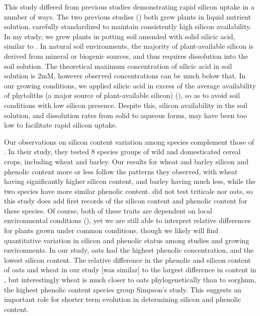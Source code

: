 \documentclass[12pt, letterpaper, ]{report}
\begin{document}
This study differed from previous studies demonstrating rapid silicon uptake in a number of ways. The two previous studies (\cite{waterman_short-term_2021-1,waterman_short-term_2021}) both grew plants in liquid nutrient solution, carefully standardized to maintain consistently high silicon availability. In my study, we grew plants in potting soil amended with solid silicic acid, similar to \textcite{nascimento_silicon_2019}. In natural soil environments, the majority of plant-available silicon is derived from mineral or biogenic sources, and thus requires dissolution into the soil solution. The theoretical maximum concentration of silicic acid in soil solution is 2mM, however observed concentrations can be much below that. In our growing conditions, we applied silicic acid in excess of the average availability of phytoliths (a major source of plant-available silicon) (\cite{de_tombeur_plants_2020}), so as to avoid soil conditions with low silicon presence. Despite this, silicon availability in the soil solution, and dissolution rates from solid to aqueous forms, may have been too low to facilitate rapid silicon uptake. 

Our observations on silicon content variation among species complement those of \textcite{simpson_still_2017}. In their study, they tested 8 species groups of wild and domesticated cereal crops, including wheat and barley. Our results for wheat and barley silicon and phenolic content more or less follow the patterns they observed, with wheat having significantly higher silicon content, and barley having much less, while the two species have more similar phenolic content. \textcite{simpson_still_2017} did not test triticale nor oats, so this study does add first records of the silicon content and phenolic content for these species. Of course, both of these traits are dependent on local environmental conditions (\cite{quigley_soil_2020,schaller_silicon_2012}), yet we are still able to interpret relative differences for plants grown under common conditions, though we likely will find quantitative variation in silicon and phenolic status among studies and growing environments. In our study, oats had the highest phenolic concentration, and the lowest silicon content. The relative difference in the phenolic and silicon content of oats and wheat in our study [was similar] to the largest difference in content in \textcite{simpson_still_2017}, but interestingly wheat is much closer to oats phylogenetically than to sorghum, the highest phenolic content species group Simpson's study. This suggests an important role for shorter term evolution in determining silicon and phenolic content. 
\end{document}

